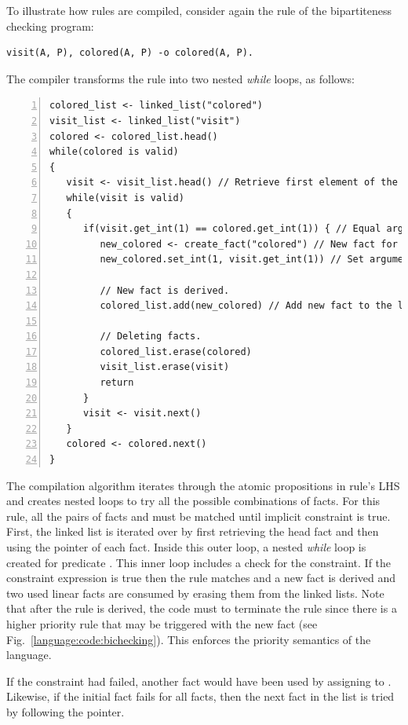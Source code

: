 To illustrate how rules are compiled, consider again the rule of the
bipartiteness checking program:

\begin{Verbatim}[fontsize=\codesize]
visit(A, P), colored(A, P) -o colored(A, P).
\end{Verbatim}

The compiler transforms the rule into two nested \emph{while} loops, as follows:

\begin{Verbatim}[numbers=left,fontsize=\codesize]
colored_list <- linked_list("colored")
visit_list <- linked_list("visit")
colored <- colored_list.head()
while(colored is valid)
{
   visit <- visit_list.head() // Retrieve first element of the list.
   while(visit is valid)
   {
      if(visit.get_int(1) == colored.get_int(1)) { // Equal arguments?
         new_colored <- create_fact("colored") // New fact for predicate colored.
         new_colored.set_int(1, visit.get_int(1)) // Set arguments.

         // New fact is derived.
         colored_list.add(new_colored) // Add new fact to the linked list.

         // Deleting facts.
         colored_list.erase(colored)
         visit_list.erase(visit)
         return
      }
      visit <- visit.next()
   }
   colored <- colored.next()
}
\end{Verbatim}

The compilation algorithm iterates through the atomic propositions in rule's LHS
and creates nested loops to try all the possible combinations of facts.  For
this rule, all the pairs of facts  and  must be
matched until implicit constraint is true. First, the  linked list
is iterated over by first retrieving the head fact and then using the
 pointer of each fact. Inside this outer loop, a nested \emph{while}
loop is created for predicate . This inner loop includes a check for
the constraint. If the constraint expression is true then the rule matches and a
new  fact is derived and two used linear facts are consumed by
erasing them from the linked lists. Note that after the rule is derived, the
code must  to terminate the rule since there is a higher priority
rule that may be triggered with the new  fact (see
Fig.~\ref{language:code:bichecking}). This enforces the priority semantics of
the language.
    
If the constraint had failed, another  fact would have been used by
assigning  to .  Likewise, if the initial
 fact fails for all  facts, then the next
 fact in the list is tried by following the  pointer.

